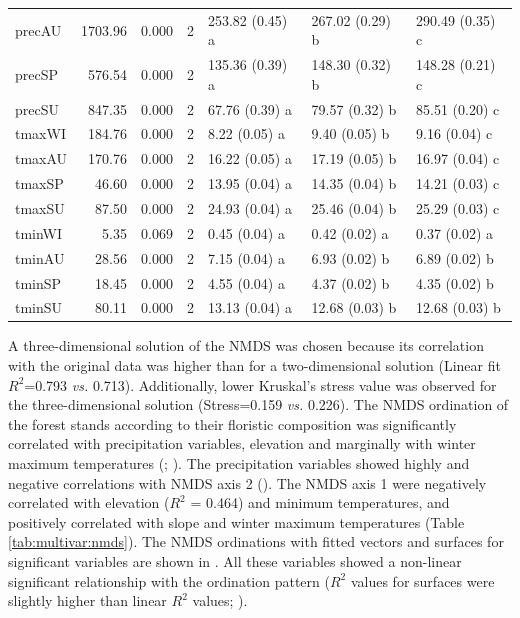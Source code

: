 \begin{table}
\begin{tabular}{lrrllll}
\hspace{1em}precAU & 1703.96 & 0.000 & 2 & 253.82 (0.45) a & 267.02 (0.29) b & 290.49 (0.35) c\\
\hspace{1em}precSP & 576.54 & 0.000 & 2 & 135.36 (0.39) a & 148.30 (0.32) b & 148.28 (0.21) c\\
\hspace{1em}precSU & 847.35 & 0.000 & 2 & 67.76 (0.39) a & 79.57 (0.32) b & 85.51 (0.20) c\\
\hspace{1em}tmaxWI & 184.76 & 0.000 & 2 & 8.22 (0.05) a & 9.40 (0.05) b & 9.16 (0.04) c\\
\hspace{1em}tmaxAU & 170.76 & 0.000 & 2 & 16.22 (0.05) a & 17.19 (0.05) b & 16.97 (0.04) c\\
\hspace{1em}tmaxSP & 46.60 & 0.000 & 2 & 13.95 (0.04) a & 14.35 (0.04) b & 14.21 (0.03) c\\
\hspace{1em}tmaxSU & 87.50 & 0.000 & 2 & 24.93 (0.04) a & 25.46 (0.04) b & 25.29 (0.03) c\\
\hspace{1em}tminWI & 5.35 & 0.069 & 2 & 0.45 (0.04) a & 0.42 (0.02) a & 0.37 (0.02) a\\
\hspace{1em}tminAU & 28.56 & 0.000 & 2 & 7.15 (0.04) a & 6.93 (0.02) b & 6.89 (0.02) b\\
\hspace{1em}tminSP & 18.45 & 0.000 & 2 & 4.55 (0.04) a & 4.37 (0.02) b & 4.35 (0.02) b\\
\hspace{1em}tminSU & 80.11 & 0.000 & 2 & 13.13 (0.04) a & 12.68 (0.03) b & 12.68 (0.03) b\\
\bottomrule
\end{tabular}
\endgroup{}
\end{table}

A three-dimensional solution of the NMDS was chosen because its correlation with the original data was higher than for a two-dimensional solution (Linear fit \(R^2\)=0.793 \emph{vs.} 0.713). Additionally, lower Kruskal's stress value was observed for the three-dimensional solution (Stress=0.159 \emph{vs.} 0.226). The NMDS ordination of the forest stands according to their floristic composition was significantly correlated with precipitation variables, elevation and marginally with winter maximum temperatures (; ). The precipitation variables showed highly and negative correlations with NMDS axis 2 (). The NMDS axis 1 were negatively correlated with elevation (\(R^2\) = 0.464) and minimum temperatures, and positively correlated with slope and winter maximum temperatures (Table \ref{tab:multivar:nmds}). The NMDS ordinations with fitted vectors and surfaces for significant variables are shown in . All these variables showed a non-linear significant relationship with the ordination pattern (\(R^2\) values for surfaces were slightly higher than linear \(R^2\) values; ).

